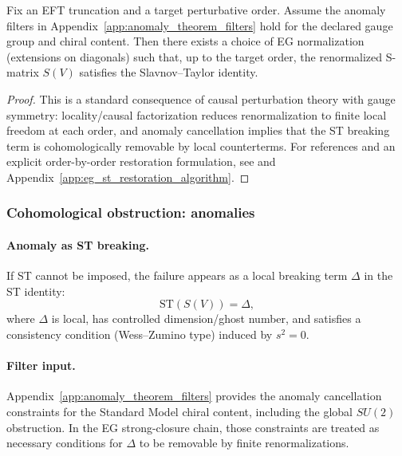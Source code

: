 \begin{theorem}
\label{thm:eg_st_normalization_finite_order}
\MathTag Fix an EFT truncation and a target perturbative order.
Assume the anomaly filters in Appendix~\ref{app:anomaly_theorem_filters} hold for the declared gauge group and chiral content.
Then there exists a choice of EG normalization (extensions on diagonals) such that, up to the target order, the renormalized S-matrix $S(V)$ satisfies the Slavnov--Taylor identity.
\end{theorem}
\begin{proof}
This is a standard consequence of causal perturbation theory with gauge symmetry: locality/causal factorization reduces renormalization to finite local freedom at each order, and anomaly cancellation implies that the ST breaking term is cohomologically removable by local counterterms.
For references and an explicit order-by-order restoration formulation, see \cite{EpsteinGlaser1973,BrunettiFredenhagen2000Microlocal,Dutsch2019pAQFT,BecchiRouetStora1976,Tyutin1975} and Appendix~\ref{app:eg_st_restoration_algorithm}.
\end{proof}

\subsubsection{Cohomological obstruction: anomalies}
\paragraph{Anomaly as ST breaking.}
If ST cannot be imposed, the failure appears as a local breaking term $\Delta$ in the ST identity:
\[
\mathrm{ST}(S(V))=\Delta,
\]
where $\Delta$ is local, has controlled dimension/ghost number, and satisfies a consistency condition (Wess--Zumino type) induced by $s^2=0$.

\paragraph{Filter input.}
Appendix~\ref{app:anomaly_theorem_filters} provides the anomaly cancellation constraints for the Standard Model chiral content, including the global $SU(2)$ obstruction.
In the EG strong-closure chain, those constraints are treated as necessary conditions for $\Delta$ to be removable by finite renormalizations.

